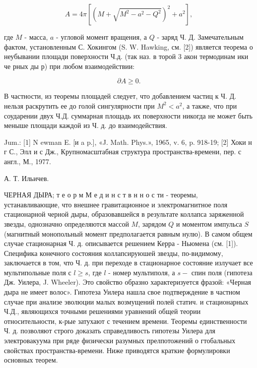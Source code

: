 \documentclass[10pt]{article}
\begin{document}
\[

A=4 \pi\left[\left(M+\sqrt{M^{2}-a^{2}-Q^{2}}\right)^{2}+a^{2}\right],

\]



где $M$ - масса, $a$ - угловой момент вращения, а $Q$ - заряд Ч. Д. Замечательным фактом, установленным С. Хокингом (S. W. Hawking, см. [2]) является теорема о неубывании площади поверхности Ч.д. (так наз. в торой 3 акон термодинам ики че рных ды р) при любом взаимодействии:



\[

\partial A \geqslant 0 .

\]



В частности, из теоремы площадей следует, что добавлением частиц к Ч. Д. нельзя раскрутить ее до голой сингулярности при $M^{2}<a^{2}$, а также, что при соударении двух Ч.Д. суммарная площадь их поверхности никогда не может быть меныше площади каждой из Ч. д. до взаимодействия.



Jum.: [1] N ewman E. [и a p.], «J. Math. Phys.», 1965, v. 6, p. 918-19; [2] Хоки н г С., Элл и с Дж., Крупномасштабная структура пространства-времени, пер. с англ., М., 1977.



А. Т. Ильичев.



ЧЕРНАЯ ДЫРА; т е о р м М е д и н с т в н н о с ти - теоремы, устанавливающие, что внешнее гравитационное и электромагнитное поля стационарной черной дыры, образовавшейся в результате коллапса заряженной звезды, однозначно определяются массой $M$, зарядом $Q$ и моментом импульса $S$ (магнитный монопольный момент предполагается равным нулю). В самом общем случае стационарная Ч. д. описывается решением Керра - Ньюмена (см. [1]). Специфика конечного состояния коллапсируюшей звезды, по-видимому, заключается в том, что Ч. д. при переходе в стационарное состояние излучает все мультипольные поля с $l \geqslant s$, где $l$ - номер мультиполя, а $s-$ спин поля (гипотеза Дж. Уилера, J. Wheeler). Это свойство образно характеризуется фразой: «Черная дыра не имеет волос». Гипотеза Уилера нашла свое подтверждение в частном случае при анализе эволюции малых возмущений полей статич. и стационарных Ч.Д., являющихся точными решениями уравнений общей теории относительности, к-рые затухают с течением времени. Теоремы единственности Ч. д. позволяют строго доказать справедливость гипотезы Уилера для электровакуума при ряде физически разумных прелпотожений о гтобальных свойствах пространства-времени. Ниже приводятся краткие формулировки основных теорем.
\end{document}
